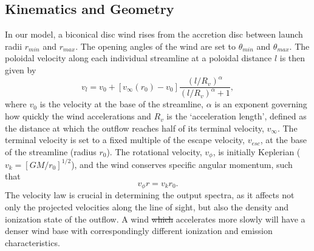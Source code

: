 \documentclass[preprint, a4paper, 11pt]{aastex}
\providecommand{\DIFadd}[1]{{\protect\color{blue}\uwave{#1}}} %
\providecommand{\DIFdel}[1]{{\protect\color{red}\sout{#1}}}                      %
\providecommand{\DIFaddbegin}{} %
\providecommand{\DIFaddend}{} %
\providecommand{\DIFdelbegin}{} %
\providecommand{\DIFdelend}{} %
\begin{document}



\DIFdelend \subsection{Kinematics and Geometry}

In our model, a biconical disc wind rises from the accretion 
disc between launch radii $r_{min}$ and $r_{max}$.
The opening angles of the wind are set to $\theta_{min}$ and $\theta_{max}$.
The poloidal velocity along each individual streamline at a poloidal distance $l$ 
is then given by
\begin{equation}
v_l=v_0+\left[v_{\infty}(r_0)-v_0\right]\frac{\left(l/R_v\right)^{\alpha}}{\left(l/R_v\right)^{\alpha}+1},
\label{v_law}
\end{equation}
where $v_0$ is the velocity at the base of the streamline, $\alpha$ is
an exponent governing how quickly the wind accelerations and 
$R_v$ is the `acceleration length', defined as the distance at which
the outflow reaches half of its terminal velocity, $v_{\infty}$.
The terminal velocity is set to a fixed multiple of the escape
velocity, $v_{esc}$, at the base of the streamline (radius $r_0$).
The rotational velocity, $v_{\phi}$, is initially Keplerian ($v_k = [GM/r_0]^{1/2}$),
and the wind conserves specific angular momentum, such that 
\begin{equation}
v_{\phi} r = v_k r_0.
\label{v_law}
\end{equation}
The velocity law is crucial in determining the output spectra,
as it affects not only the projected velocities along the line of sight,
but also the density and ionization state of the outflow.
A wind \DIFdelbegin \DIFdel{which }\DIFdelend \DIFaddbegin \DIFadd{that }\DIFaddend accelerates more slowly will have a denser wind base
with correspondingly different ionization and emission characteristics.
\end{document}

